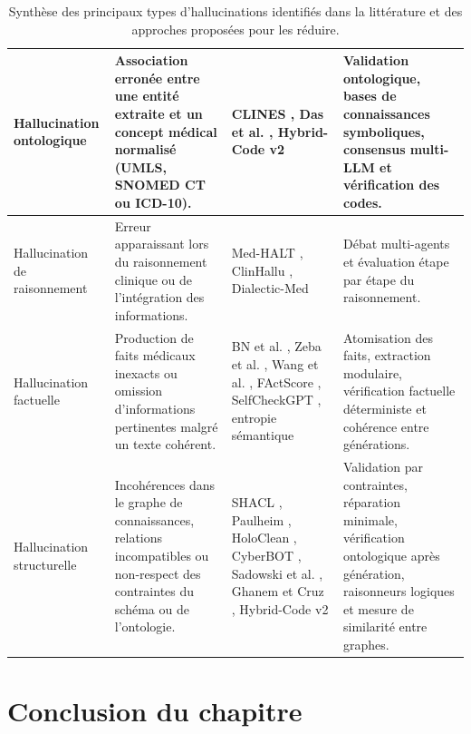 \begin{table}[ht]
\begin{tabular}{|p{2.8cm}|p{4.4cm}|p{3.5cm}|p{4.3cm}|}
Hallucination ontologique &
Association erronée entre une entité extraite et un concept médical normalisé (UMLS, SNOMED CT ou ICD-10). &
CLINES \cite{yang2025clines}, Das et al. \cite{das2026clinical}, Hybrid-Code v2 \cite{hybrid2512v2} &
Validation ontologique, bases de connaissances symboliques, consensus multi-LLM et vérification des codes.\\
\hline

Hallucination de raisonnement &
Erreur apparaissant lors du raisonnement clinique ou de l'intégration des informations. &
Med-HALT \cite{pal2023medhalt}, ClinHallu \cite{yang2026clinhallu}, Dialectic-Med \cite{lu2026dialectic} &
Débat multi-agents et évaluation étape par étape du raisonnement.\\
\hline

Hallucination factuelle &
Production de faits médicaux inexacts ou omission d'informations pertinentes malgré un texte cohérent. &
BN et al. \cite{bn2025fact}, Zeba et al. \cite{zeba2026mitigating}, Wang et al. \cite{wang2024feature}, FActScore \cite{min2023factscore}, SelfCheckGPT \cite{manakul2023selfcheckgpt}, entropie sémantique \cite{farquhar2024semantic} &
Atomisation des faits, extraction modulaire, vérification factuelle déterministe et cohérence entre générations.\\
\hline

Hallucination structurelle &
Incohérences dans le graphe de connaissances, relations incompatibles ou non-respect des contraintes du schéma ou de l'ontologie. &
SHACL \cite{shacl2017}, Paulheim \cite{paulheim2017refinement}, HoloClean \cite{rekatsinas2017holoclean}, CyberBOT \cite{zhao2025cyberbot}, Sadowski et al. \cite{sadowski2026structured}, Ghanem et Cruz \cite{ghanem2024enhancing}, Hybrid-Code v2 \cite{hybrid2512v2} &
Validation par contraintes, réparation minimale, vérification ontologique après génération, raisonneurs logiques et mesure de similarité entre graphes.\\
\hline

\end{tabular}
\caption{Synthèse des principaux types d'hallucinations identifiés dans la littérature et des approches proposées pour les réduire.}
\label{tab:hallucinations}
\end{table}

\section{Conclusion du chapitre}

